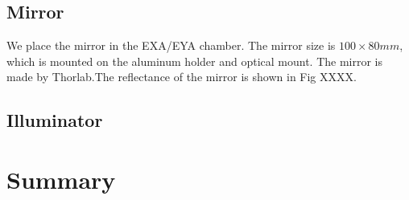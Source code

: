 \subsection{Mirror}
We place the mirror in the EXA/EYA chamber. The mirror size is $100 \times 80 mm$, which is mounted on the aluminum holder and optical mount. The mirror is made by Thorlab.The reflectance of the mirror is shown in Fig XXXX.
\subsection{Illuminator}

\section{Summary}
